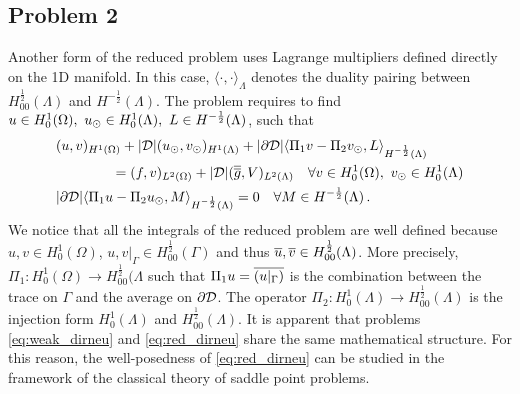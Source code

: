 \documentclass[r]{siamart171218}
\begin{document}
\subsection{Problem 2}
Another form of the reduced problem uses Lagrange multipliers defined directly on the 1D manifold.
In this case, $\langle \cdot , \cdot \rangle_\Lambda$ denotes the duality pairing between 
$H^\frac12_{00}(\Lambda)$ and $H^{-\frac12}(\Lambda)$.
The problem requires to find $u \in H^1_0(\Omega),\ u_{\odot} \in H^1_0(\Lambda), \ L \in H^{-\frac12}(\Lambda)$, such that
\begin{subequations}\label{eq:problem2}
\begin{align}
&(u,v)_{H^1(\Omega)} + |{\cal D}|(\ud,\vd)_{H^1(\Lambda)} 
+ |\partial {\cal D}| \langle \Pi_1 v - \Pi_2 \vd, L \rangle_{H^{-\frac12}(\Lambda)} 
\\
\nonumber
&\qquad\qquad= (f,v)_{L^2(\Omega)} + |{\cal D}| (\avrd{g},V)_{L^2(\Lambda)}
\quad \forall v \in H^1_0(\Omega), \ \vd \in H^1_0(\Lambda)
\\
&  |\partial {\cal D}| \langle \Pi_1 u -  \Pi_2 \ud, M \rangle_{H^{-\frac12}(\Lambda)} = 0
\quad \forall M \in H^{-\frac12}(\Lambda)\,.
\end{align}
\end{subequations}
We notice that all the integrals of the reduced problem are well defined because $u,v \in H^1_0(\Omega)$, 
$u,v|_{\Gamma} \in H^\frac12_{00}(\Gamma)$ and thus $\overline{u},\overline{v} \in H^\frac12_{00}(\Lambda)$.
More precisely, $\Pi_1 : H^1_0(\Omega) \rightarrow H^\frac12_{00}(\Lambda$ such that
$\Pi_1 u = \overline{(u|_\Gamma)}$ is the combination between the trace on $\Gamma$ and the average on $\partial{\cal D}$.
The operator $\Pi_2: H^1_0(\Lambda) \rightarrow H^\frac12_{00}(\Lambda)$ is the injection form $H^1_0(\Lambda)$ and $H^\frac12_{00}(\Lambda)$.
It is apparent that problems \eqref{eq:weak_dirneu} and \eqref{eq:red_dirneu} share the same mathematical structure.
For this reason, the well-posedness of \eqref{eq:red_dirneu} can be studied in the framework of the classical theory of saddle point problems.
\end{document}
